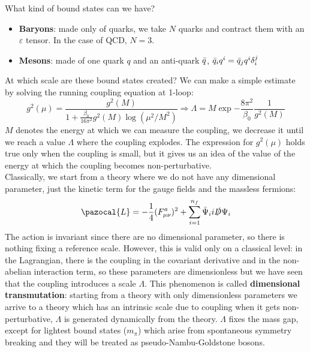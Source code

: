 \documentclass[../main.tex]{subfiles}
\begin{document}
What kind of bound states can we have?
\begin{itemize}
    \item \textbf{Baryons}: made only of quarks, we take $N$ quarks and contract them with an $\varepsilon$ tensor. In the case of QCD, $N=3$.
    \item \textbf{Mesons}: made of one quark $q$ and an anti-quark $\Bar{q}$, $\Bar{q}_iq^i=\Bar{q}_jq^i\delta_i^j$
\end{itemize}
At which scale are these bound states created? We can make a simple estimate by solving the running coupling equation at 1-loop:
\[
g^2(\mu)=\frac{g^2(M)}{1+\frac{\beta_0}{16\pi^2}g^2(M)\log(\mu^2/M^2)}\Rightarrow\Lambda=M\exp{-\frac{8\pi^2}{\beta_0}\frac{1}{g^2(M)}}
\]
$M$ denotes the energy at which we can measure the coupling, we decrease it until we reach a value $\Lambda$ where the coupling explodes. The expression for $g^2(\mu)$ holds true only when the coupling is small, but it gives us an idea of the value of the energy at which the coupling becomes non-perturbative.\\
Classically, we start from a theory where we do not have any dimensional parameter, just the kinetic term for the gauge fields and the massless fermions:
\[
\pazocal{L}=-\frac{1}{4}(F_{\mu\nu}^a)^2+\sum_{i=1}^{n_f}\Bar{\Psi}_ii\slashed{D}\Psi_i
\]
The action is invariant since there are no dimensional parameter, so there is nothing fixing a reference scale. However, this is valid only on a classical level: in the Lagrangian, there is the coupling in the covariant derivative and in the non-abelian interaction term, so these parameters are dimensionless but we have seen that the coupling introduces a scale $\Lambda$. This phenomenon is called \textbf{dimensional transmutation}: starting from a theory with only dimensionless parameters we arrive to a theory which has an intrinsic scale due to coupling when it gets non-perturbative, $\Lambda$ is generated dynamically from the theory. $\Lambda$ fixes the mass gap, except for lightest bound states ($m_\pi$) which arise from spontaneous symmetry breaking and they will be treated as pseudo-Nambu-Goldstone bosons.\\
\end{document}
